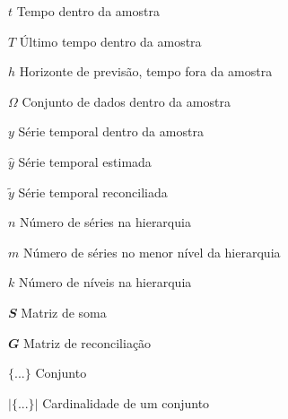 \begin{simbolos}
  \item[$ t $] Tempo dentro da amostra
  \item[$ T $] Último tempo dentro da amostra
  \item[$ h $] Horizonte de previsão, tempo fora da amostra
  \item[$ \Omega $] Conjunto de dados dentro da amostra
  \item[$ y $] Série temporal dentro da amostra
  \item[$ \hat{y} $] Série temporal estimada
  \item[$ \tilde{y} $] Série temporal reconciliada
  \item[$ n $] Número de séries na hierarquia
  \item[$ m $] Número de séries no menor nível da hierarquia
  \item[$ k $] Número de níveis na hierarquia
  \item[$ \mathbfit{S} $] Matriz de soma
  \item[$ \mathbfit{G} $] Matriz de reconciliação
  \item[$\{...\}$] Conjunto
  \item[$|\{...\}|$] Cardinalidade de um conjunto
\end{simbolos}

\tableofcontents*
\cleardoublepage

\textual
\pagestyle{simple}